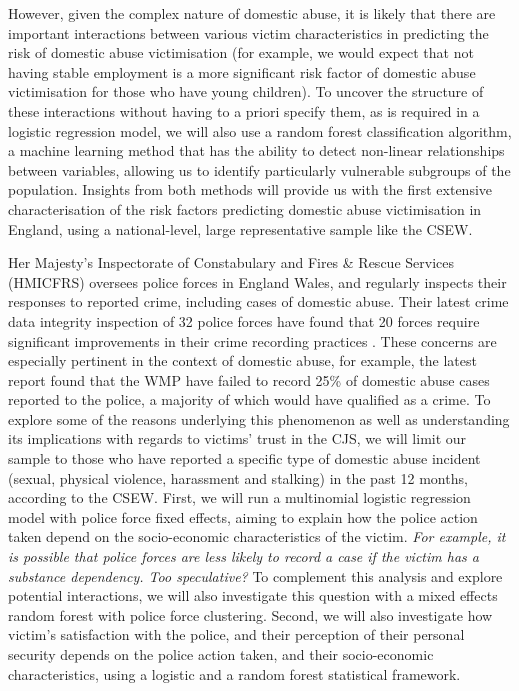 \documentclass[11pt, a4paper]{article}
\begin{document}
 However, given the complex nature of domestic abuse, it is likely that there are important interactions between various victim characteristics in predicting the risk of domestic abuse victimisation (for example, we would expect that not having stable employment is a more significant risk factor of domestic abuse victimisation for those who have young children). To uncover the structure of these interactions without having to a priori specify them, as is required in a logistic regression model, we will also use a random forest classification algorithm, a machine learning method that has the ability to detect non-linear relationships between variables, allowing us to identify particularly vulnerable subgroups of the population. Insights from both methods will provide us with the first extensive characterisation of the risk factors predicting domestic abuse victimisation in England, using a national-level, large representative sample like the CSEW.
 
 
 Her Majesty's Inspectorate of Constabulary and Fires \& Rescue Services (HMICFRS) oversees police forces in England Wales, and regularly inspects their responses to reported crime, including cases of domestic abuse. Their latest crime data integrity inspection of 32 police forces have found that 20 forces require significant improvements in their crime recording practices \cite{HerMajestysInspectorateofConstabularyandFires&RescueServices2019}. These concerns are especially pertinent in the context of domestic abuse, for example, the latest report found that the WMP have failed to record 25\% of domestic abuse cases reported to the police, a majority of which would have qualified as a crime. To explore some of the reasons underlying this phenomenon as well as understanding its implications with regards to victims' trust in the CJS, we will limit our sample to those who have reported a specific type of domestic abuse incident (sexual, physical violence, harassment and stalking) in the past 12 months, according to the CSEW. First, we will run a multinomial logistic regression model with police force fixed effects, aiming to explain how the police action taken depend on the socio-economic characteristics of the victim. \textit{For example, it is possible that police forces are less likely to record a case if the victim has a substance dependency. Too speculative?} To complement this analysis and explore potential interactions, we will also investigate this question with a mixed effects random forest with police force clustering. Second, we will also investigate how victim's satisfaction with the police, and their perception of their personal security depends on the police action taken, and their socio-economic characteristics, using a logistic and a random forest statistical framework.  
 
\end{document}
